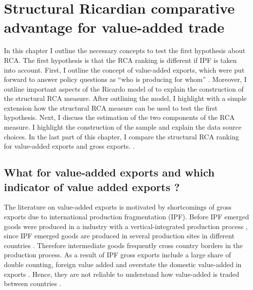 \chapter{Structural Ricardian comparative advantage for value-added trade}
\label{cha:empirical}
In this chapter I outline the necessary concepts to test the first hypothesis about RCA.
The first hypothesis is that the RCA ranking is different if IPF is taken into account.
First, I outline the concept of value-added exports, which were put forward to answer policy questions as ``who is producing for whom'' \textcite{daudin2011}.
 Moreover, I outline important aspects of the Ricardo model of \textcite{costinot} to explain the construction of the structural RCA measure.
 After outlining the model, I highlight with a simple extension how the structural RCA measure can be used to test the first hypothesis.
Next, I discuss the estimation of the two components of the RCA measure.
I highlight the construction of the sample and explain the data source choices.
In the last part of this chapter, I compare the structural RCA ranking for value-added exports and gross exports.
. %
\section{What for value-added exports and which indicator of value added exports ?} \label{sec:vax}
The literature on value-added exports is motivated by shortcomings of gross exports due to international production fragmentation (IPF).
Before IPF emerged goods were produced in a industry with a vertical-integrated production process \textcite{Feenstra}, since IPF emerged
goods are produced in several production sites in different countries \textcite{daudin2011}.
Therefore intermediate goods frequently cross country borders in the production process.
 As a result of IPF gross exports include a large share of double counting, foreign value added and overstate the domestic value-added in exports \textcite{johnson}.
Hence, they are not reliable to understand how value-added is traded between countries \parencite{johnson}. \par

